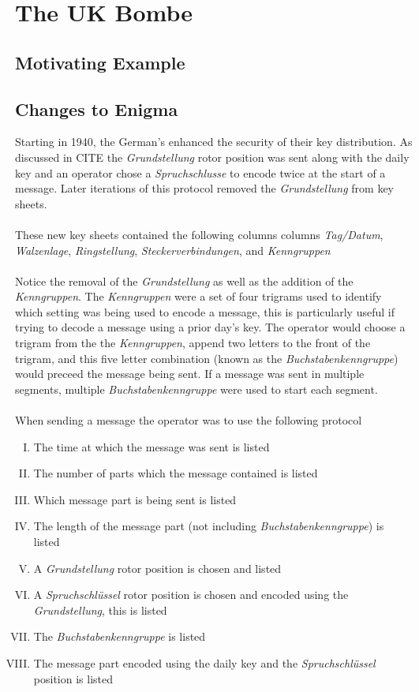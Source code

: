 \chapter{The UK Bombe}

\section{Motivating Example}

\section{Changes to Enigma}

Starting in 1940, the German's enhanced the security of their 
key distribution. As discussed in CITE the \emph{Grundstellung} rotor 
position was sent along with the daily key and an operator chose a \emph{Spruchschlusse} to 
encode twice at the start of a message. Later iterations of this protocol removed the \emph{Grundstellung}
from key sheets.
\\\\These new key sheets contained the following columns
columns \emph{Tag/Datum}, \emph{Walzenlage}, \emph{Ringstellung}, \emph{Steckerverbindungen}, and \emph{Kenngruppen} 
\\\\Notice the removal of the \emph{Grundstellung} as well as the addition of the \emph{Kenngruppen}. The \emph{Kenngruppen} were a set of 
four trigrams used to identify which setting was being used to encode a message, this is particularly useful if trying to decode a message using a prior day's key. 
The operator would choose a trigram from the the \emph{Kenngruppen}, append two letters to the front of the trigram,
and this five letter combination (known as the \emph{Buchstabenkenngruppe}) would preceed the message being sent. If a message
was sent in multiple segments, multiple \emph{Buchstabenkenngruppe} were used to start each segment.
\\\\When sending a message the operator was to use the following protocol
\begin{enumerate}[I.]
\item The time at which the message was sent is listed
\item The number of parts which the message contained is listed
\item Which message part is being sent is listed
\item The length of the message part (not including \emph{Buchstabenkenngruppe}) is listed
\item A \emph{Grundstellung} rotor position is chosen and listed 
\item A \emph{Spruchschlüssel} rotor position is chosen and encoded using the \emph{Grundstellung}, this is listed
\item The \emph{Buchstabenkenngruppe} is listed
\item The message part encoded using the daily key and the \emph{Spruchschlüssel} position is listed
\end{enumerate}
